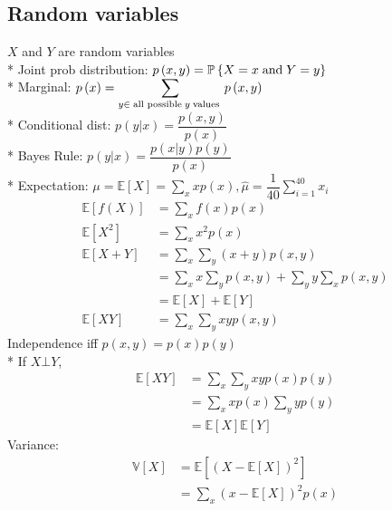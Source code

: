\documentclass{article}
\begin{document}
\subsection{Random variables}
$X $ and $Y $ are random variables
\\* Joint prob distribution: $p\left(x, y\right)  = \mathbb{P}\left\{X = x \text{\;and\;} Y = y\right\}$
\\* Marginal: $p\left(x\right)  = \displaystyle\sum_{y \in \text{\;all possible\;} y  \text{\;values\;}} p\left(x, y\right) $
\\* Conditional dist: $p\left(y | x\right)  = \dfrac{p\left(x, y\right)}{p\left(x\right)}$
\\* Bayes Rule: $p\left(y | x\right)  = \dfrac{p\left(x | y\right) p\left(y\right)}{p\left(x\right)}$
\\* Expectation: $\mu = \mathbb{E}\left[X\right] = \displaystyle\sum_{x} x p\left(x\right) , \hat{\mu} = \dfrac{1}{40} \displaystyle\sum_{i=1}^{40} x_{i}$
\begin{align*}
\mathbb{E}\left[f\left(X\right)\right] &= \displaystyle\sum_{x} f\left(x\right) p\left(x\right) 
\\ \mathbb{E}\left[X^{2}\right] &= \displaystyle\sum_{x} x^{2} p\left(x\right) 
\\ \mathbb{E}\left[X + Y\right] &= \displaystyle\sum_{x} \displaystyle\sum_{y} \left(x + y\right) p\left(x, y\right)
\\ &= \displaystyle\sum_{x} x \displaystyle\sum_{y} p\left(x, y\right)  + \displaystyle\sum_{y} y \displaystyle\sum_{x} p\left(x, y\right) 
\\ &= \mathbb{E}\left[X\right] + \mathbb{E}\left[Y\right]
\\ \mathbb{E}\left[X Y\right] &= \displaystyle\sum_{x} \displaystyle\sum_{y} x y p\left(x, y\right) 
\end{align*}
Independence iff $p\left(x, y\right)  = p\left(x\right)  p\left(y\right) $
\\* If $X \bot Y$,
\begin{align*}
\mathbb{E}\left[X Y\right] &= \displaystyle\sum_{x} \displaystyle\sum_{y} x y p\left(x\right)  p\left(y\right) 
\\ &= \displaystyle\sum_{x} x p\left(x\right)  \displaystyle\sum_{y} y p\left(y\right) 
\\ &= \mathbb{E}\left[X\right] \mathbb{E}\left[Y\right]
\end{align*}
Variance:
\begin{align*}
\mathbb{V}\left[X\right] &= \mathbb{E}\left[\left(X - \mathbb{E}\left[X\right]\right)^{2}\right]
\\ &= \displaystyle\sum_{x} \left(x - \mathbb{E}\left[X\right]\right)^{2} p\left(x\right) 
\end{align*}
\end{document}
